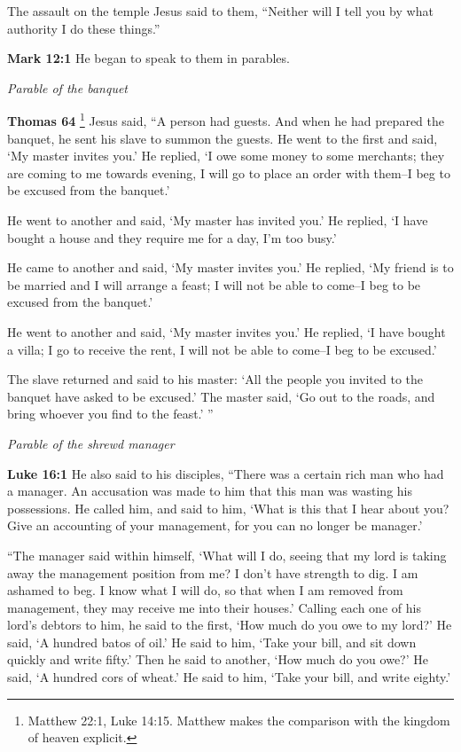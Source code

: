 \documentclass[10pt,twoside]{article} %
\newcommand{\quotesize}{\normalsize{}}
\newenvironment{quotetext}{\begingroup\quotesize}{\endgroup}
\newcommand{\bible}[2]{\begin{quotetext}\textbf{#1} #2\end{quotetext}}
\newcommand{\gospelmark}[2]{\bible{Mark #1}{#2}}
\newcommand{\luke}[2]{\bible{Luke #1}{#2}}
\newcommand{\thomas}[2]{\bible{Thomas #1}{#2}}
\newcommand{\subhead}[1]{\emph{#1}\par}
\begin{document}
\begin{section}{The assault on the temple}
{Jesus said to them, ``Neither will I tell you by what authority I do these things.'' 
}

\gospelmark{12:1}{
   He began to speak to them in parables.}

\subhead{Parable of the banquet}

\thomas{64}{\footnote{Matthew 22:1, Luke 14:15. Matthew makes the comparison with the kingdom of heaven explicit.}
Jesus said, ``A person had guests. And when he had prepared the banquet, he sent his
slave to summon the guests. He went to the first and said, `My
master invites you.' He replied, `I owe some money to some merchants;
they are coming to me towards evening, I will go to place an order
with them--I beg to be excused from the banquet.'

He went to another and said,
`My master has invited you.' He replied, `I
have bought a house and they require me for a day, I'm too busy.'

He came to another and said, `My master
invites you.' He replied, `My friend is to be married and I
will arrange a feast; I will not be able to come--I beg to be
excused from the banquet.'

He went to another and said, `My
master invites you.' He replied, `I have bought a villa; I go
to receive the rent, I will not be able to come--I beg to be
excused.'

The slave returned and said to his master: `All the people you
invited to the banquet have asked to be excused.' The master said,
`Go out to the roads, and bring whoever you find
to the feast.' ''
}


\subhead{Parable of the shrewd manager}

\luke{16:1}{
He also said to his disciples, ``There was a certain rich man who had a manager. An accusation was made to him that this man was wasting his possessions.  
  He called him, and said to him, `What is this that I hear about you? Give an accounting of your management, for you can no longer be manager.'

   ``The manager said within himself, `What will I do, seeing that my lord is taking away the management position from me? I don't have strength to dig. I am ashamed to beg.    I know what I will do, so that when I am removed from management, they may receive me into their houses.'    Calling each one of his lord's debtors to him, he said to the first, `How much do you owe to my lord?'    He said, `A hundred batos of oil.' He said to him, `Take your bill, and sit down quickly and write fifty.'    Then he said to another, `How much do you owe?' He said, `A hundred cors of wheat.' He said to him, `Take your bill, and write eighty.'

}
\end{section}
\end{document}

